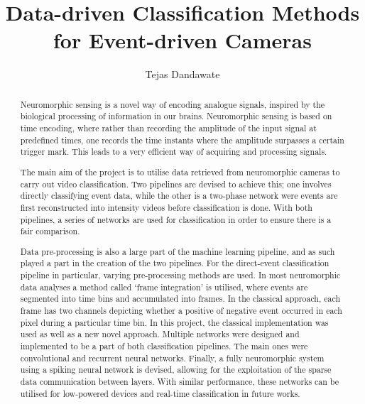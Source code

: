 \documentclass[a4paper, twoside, 11pt]{report}
\title{Data-driven Classification Methods for Event-driven Cameras}
\author{Tejas Dandawate}
\begin{document}


\begin{abstract}
    Neuromorphic sensing is a novel way of encoding analogue signals, inspired by the biological processing of information in our brains. Neuromorphic sensing is based on time encoding, where rather than recording the amplitude of the input signal at predefined times, one records the time instants where the amplitude surpasses a certain trigger mark. This leads to a very efficient way of acquiring and processing signals.

    The main aim of the project is to utilise data retrieved from neuromorphic cameras to carry out video classification. Two pipelines are devised to achieve this; one involves directly classifying event data, while the other is a two-phase network were events are first reconstructed into intensity videos before classification is done. With both pipelines, a series of networks are used for classification in order to ensure there is a fair comparison.
    
    Data pre-processing is also a large part of the machine learning pipeline, and as such played a part in the creation of the two pipelines. For the direct-event classification pipeline in particular, varying pre-processing methods are used. In most neuromorphic data analyses a method called `frame integration' is utilised, where events are segmented into time bins and accumulated into frames. In the classical approach, each frame has two channels depicting whether a positive of negative event occurred in each pixel during a particular time bin. In this project, the classical implementation was used as well as a new novel approach. Multiple networks were designed and implemented to be a part of both classification pipelines. The main ones  were convolutional and recurrent neural networks. Finally, a fully neuromorphic system using a spiking neural network is devised, allowing for the exploitation of the sparse data communication between layers. With similar performance, these networks can be utilised for low-powered devices and real-time classification in future works.
\end{abstract}
\end{document}
